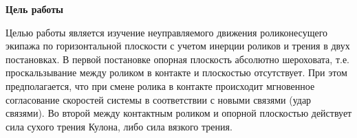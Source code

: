 
\textbf{Цель работы}

Целью работы является изучение неуправляемого движения роликонесущего экипажа по горизонтальной плоскости с учетом инерции роликов и трения в двух постановках. В первой постановке опорная плоскость абсолютно шероховата, т.е. проскальзывание между роликом в контакте и плоскостью отсутствует. При этом предполагается, что при смене ролика в контакте происходит мгновенное согласование скоростей системы в соответствии с новыми связями (удар связями). Во второй между контактным роликом и опорной плоскостью действует сила сухого трения Кулона, либо сила вязкого трения.